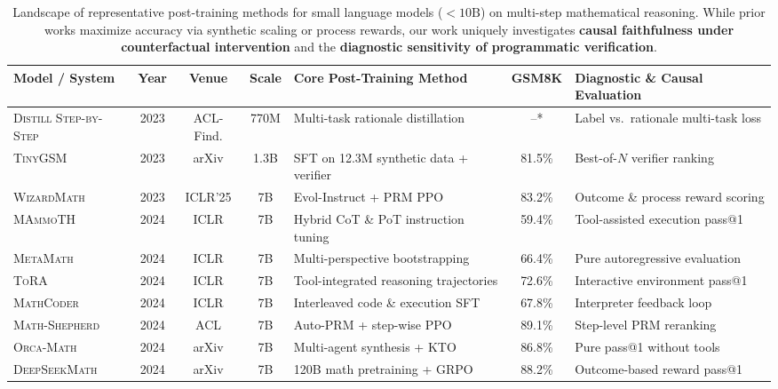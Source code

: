 \documentclass[11pt,a4paper]{article}
\begin{document}
\begin{table}[t]
\centering
\scriptsize
\setlength{\tabcolsep}{3pt}
\caption{Landscape of representative post-training methods for small language models ($<10\text{B}$) on multi-step mathematical reasoning. While prior works maximize accuracy via synthetic scaling or process rewards, our work uniquely investigates \textbf{causal faithfulness under counterfactual intervention} and the \textbf{diagnostic sensitivity of programmatic verification}.}
\label{tab:slm_landscape}
\begin{tabularx}{\textwidth}{p{3.2cm} c c c X c p{4.6cm}}
\toprule
\textbf{Model / System} & \textbf{Year} & \textbf{Venue} & \textbf{Scale} & \textbf{Core Post-Training Method} & \textbf{GSM8K} & \textbf{Diagnostic \& Causal Evaluation} \\
\midrule
\textsc{Distill Step-by-Step} \citep{hsieh2023distilling} & 2023 & ACL-Find. & 770M & Multi-task rationale distillation & --* & Label vs.\ rationale multi-task loss \\
\textsc{TinyGSM} \citep{li2023tinygsm} & 2023 & arXiv & 1.3B & SFT on 12.3M synthetic data + verifier & 81.5\% & Best-of-$N$ verifier ranking \\
\textsc{WizardMath} \citep{luo2023wizardmath} & 2023 & ICLR'25 & 7B & Evol-Instruct + PRM PPO & 83.2\% & Outcome \& process reward scoring \\
\textsc{MAmmoTH} \citep{yue2023mammoth} & 2024 & ICLR & 7B & Hybrid CoT \& PoT instruction tuning & 59.4\% & Tool-assisted execution pass@1 \\
\textsc{MetaMath} \citep{yu2023metamath} & 2024 & ICLR & 7B & Multi-perspective bootstrapping & 66.4\% & Pure autoregressive evaluation \\
\textsc{ToRA} \citep{gou2023tora} & 2024 & ICLR & 7B & Tool-integrated reasoning trajectories & 72.6\% & Interactive environment pass@1 \\
\textsc{MathCoder} \citep{wang2023mathcoder} & 2024 & ICLR & 7B & Interleaved code \& execution SFT & 67.8\% & Interpreter feedback loop \\
\textsc{Math-Shepherd} \citep{wang2023mathshepherd} & 2024 & ACL & 7B & Auto-PRM + step-wise PPO & 89.1\% & Step-level PRM reranking \\
\textsc{Orca-Math} \citep{mitra2024orcamath} & 2024 & arXiv & 7B & Multi-agent synthesis + KTO & 86.8\% & Pure pass@1 without tools \\
\textsc{DeepSeekMath} \citep{shao2024deepseekmath} & 2024 & arXiv & 7B & 120B math pretraining + GRPO & 88.2\% & Outcome-based reward pass@1 \\

\end{tabularx}
\end{table}
\end{document}
